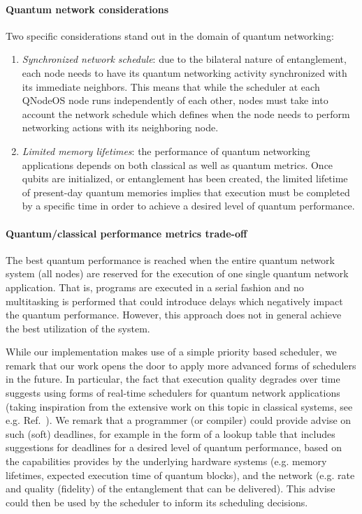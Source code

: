 \paragraph{Quantum network considerations}

Two specific considerations stand out in the domain of quantum networking:
%
\begin{enumerate}
\item \emph{Synchronized network schedule}: due to the bilateral nature of entanglement, each node needs to have its quantum networking activity synchronized with its immediate neighbors. This means that while the scheduler at each \ac{QNodeOS} node runs independently of each other, nodes must take into account the network schedule which defines when the node needs to perform networking actions with its neighboring node. 
\item \emph{Limited memory lifetimes}: the performance of quantum networking applications depends on both classical as well as quantum metrics. Once qubits are initialized, or entanglement has been created, the limited lifetime of present-day quantum memories implies that execution must be completed by a specific time in order to achieve a desired level of quantum performance. 
\end{enumerate}

\paragraph{Quantum/classical performance metrics trade-off}

The best quantum performance is reached when the entire quantum network system (all nodes) are reserved for the execution of one single quantum network application. That is, programs are executed in a serial fashion and no multitasking is performed that could introduce delays which negatively impact the quantum performance. However, this approach does not in general achieve the best utilization of the system. 

While our implementation makes use of a simple priority based scheduler, we remark that our work opens the door to apply more advanced forms of schedulers in the future. In particular, the fact that execution quality degrades over time suggests using forms of real-time schedulers for quantum network applications (taking inspiration from the extensive work on this topic in classical systems, see e.g. Ref.~\cite{liu_1973_scheduling}).  We remark that a programmer (or compiler) could provide advise on such (soft) deadlines, for example in the form of a lookup table that includes suggestions for deadlines for a desired level of quantum performance, based on the capabilities provides by the underlying hardware systems (e.g. memory lifetimes, expected execution time of quantum blocks), and the network (e.g. rate and quality (fidelity) of the entanglement that can be delivered). This advise could then be used by the scheduler to inform its scheduling decisions.

